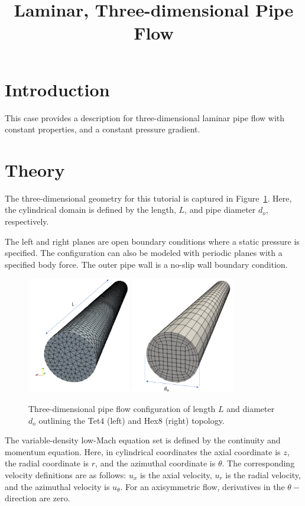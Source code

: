 \documentclass{article}
\title{Laminar, Three-dimensional Pipe Flow}
\date{}
\begin{document}
\maketitle

\section{Introduction}
This case provides a description for three-dimensional laminar
pipe flow with constant properties, and a constant pressure gradient.

\section{Theory}
The three-dimensional geometry for this tutorial is captured in 
Figure~\ref{fig:geom}. Here, the cylindrical domain is defined by the 
length, $L$, and pipe diameter $d_o$, respectively. 

The left and right planes are open boundary conditions where a static pressure is specified. The configuration
can also be modeled with periodic planes with a specified body force. The outer pipe wall is a 
no-slip wall boundary condition.

\begin{figure}[!htbp]
  \centering
  {
   \includegraphics[height=2.0in]{images/3d_tet4_hex8_pipe_geom.pdf}
  }
  \caption{Three-dimensional pipe flow configuration of length $L$ and 
    diameter $d_o$ outlining the Tet4 (left) and Hex8 (right) topology.}
  \label{fig:geom}
\end{figure}

The variable-density low-Mach equation set is defined by the continuity and momentum equation.
Here, in cylindrical coordinates the axial coordinate
is $z$, the radial coordinate is $r$, and the azimuthal
coordinate is $\theta$.  The corresponding velocity definitions are as follows:
 $u_x$ is the axial velocity, $u_r$ is the radial velocity, and the azimuthal velocity is $u_\theta$. 
For an axisymmetric flow, derivatives in the $\theta-$direction are zero.
\end{document}
